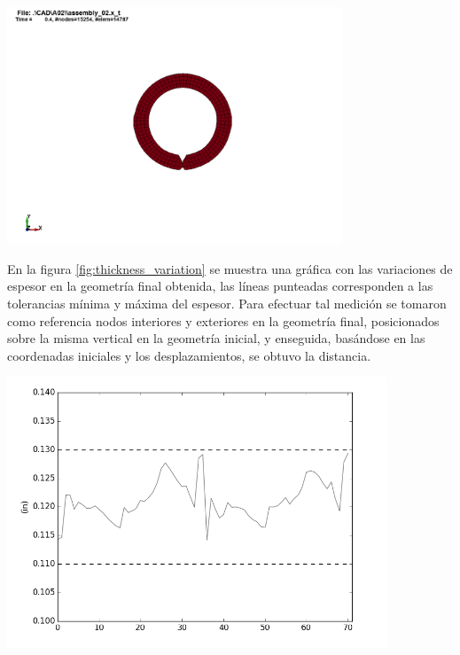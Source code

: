 \begin{center}
\includegraphics[width=0.75\textwidth]{src/ch4/geometry_02.png}
\label{fig:geometry_02}
\end{center}

En la figura \ref{fig:thickness_variation} se muestra una gráfica con las variaciones de espesor en la geometría final obtenida, las líneas punteadas corresponden a las tolerancias mínima y máxima del espesor. Para efectuar tal medición se tomaron como referencia nodos interiores y exteriores en la geometría final, posicionados sobre la misma vertical en la geometría inicial, y enseguida, basándose en las coordenadas iniciales y los desplazamientos, se obtuvo la distancia.

\begin{center}
\includegraphics[width=0.85\textwidth]{src/ch4/thickness_variation.png}
\label{fig:thickness_variation}
\end{center}



